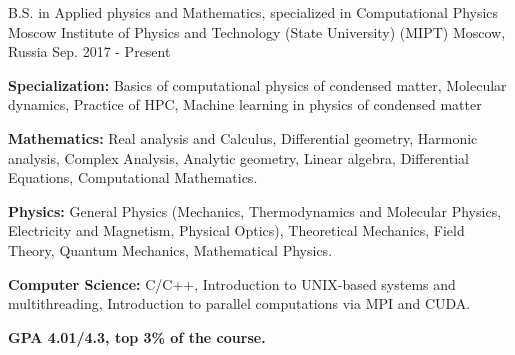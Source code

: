 

\begin{cventries}

  \cventry
    {B.S. in Applied physics and Mathematics, specialized in Computational Physics} %
    {Moscow Institute of Physics and Technology (State University) (MIPT)} %
    {Moscow, Russia} %
    {Sep. 2017 - Present} %
    {
      \begin{cvitems} %
        \item {\textbf{Specialization:} Basics of computational physics of condensed matter, Molecular dynamics, Practice of HPC, Machine learning in physics of condensed matter}
        \item {\textbf{Mathematics:} Real analysis and Calculus, Differential geometry, Harmonic analysis, Complex Analysis, Analytic geometry, Linear algebra, Differential Equations, Computational Mathematics.}
        \item {\textbf{Physics:} General Physics (Mechanics, Thermodynamics and Molecular Physics, Electricity and Magnetism, Physical Optics), Theoretical Mechanics, Field Theory, Quantum Mechanics, Mathematical Physics.}
        \item {\textbf{Computer Science:}  C/C++, Introduction to UNIX-based systems and multithreading, Introduction to parallel computations via MPI and CUDA.
		\item {\textbf{GPA 4.01/4.3, top 3\% of the course.}}        
}
      \end{cvitems}
    }

\end{cventries}
